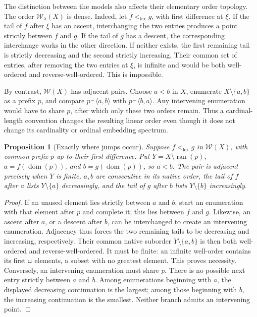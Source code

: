 \documentclass[11pt]{article}
\newtheorem{proposition}[proposition]{Proposition}
\theoremstyle{definition}
\theoremstyle{remark}
\newcommand{\WO}{\mathcal W}
\newcommand{\lex}{\mathrm{lex}}
\newcommand{\ran}{\operatorname{ran}}
\newcommand{\dom}{\operatorname{dom}}
\newcommand{\cat}{\mathbin{{}^\frown}}
\begin{document}
The distinction between the models also affects their elementary
order topology.  The order \(\WO_\lambda(X)\) is dense.
Indeed, let \(f<_{\lex}g\), with first difference at \(\xi\).
If the tail of \(f\) after \(\xi\) has an ascent, interchanging
the two entries produces a point strictly between \(f\) and \(g\).
If the tail of \(g\) has a descent, the corresponding interchange
works in the other direction.  If neither exists, the first
remaining tail is strictly decreasing and the second strictly
increasing.  Their common set of entries, after removing the two
entries at \(\xi\), is infinite and would be both well-ordered
and reverse-well-ordered.  This is impossible.

By contrast, \(\WO(X)\) has adjacent pairs.  Choose \(a<b\) in \(X\),
enumerate \(X\setminus\{a,b\}\) as a prefix \(p\), and compare
\(p\cat\langle a,b\rangle\) with
\(p\cat\langle b,a\rangle\).  Any intervening enumeration would have
to share \(p\), after which only these two orders remain.
Thus a cardinal-length convention changes the resulting linear
order even though it does not change its cardinality or ordinal
embedding spectrum.

\begin{proposition}[Exactly where jumps occur]\label{swo:sw:adjacency}
Suppose \(f<_{\lex}g\) in \(\WO(X)\), with common prefix \(p\)
up to their first difference.  Put
\(Y=X\setminus\ran(p)\), \(a=f(\dom(p))\), and
\(b=g(\dom(p))\), so \(a<b\).
The pair is adjacent precisely when \(Y\) is finite,
\(a,b\) are consecutive in its native order, the tail of
\(f\) after \(a\) lists \(Y\setminus\{a\}\) decreasingly,
and the tail of \(g\) after \(b\) lists
\(Y\setminus\{b\}\) increasingly.
\end{proposition}

\begin{proof}
If an unused element lies strictly between \(a\) and \(b\),
start an enumeration with that element after \(p\) and
complete it; this lies between \(f\) and \(g\).
Likewise, an ascent after \(a\), or a descent after \(b\),
can be interchanged to create an intervening enumeration.
Adjacency thus forces the two remaining tails to be
decreasing and increasing, respectively.
Their common native suborder \(Y\setminus\{a,b\}\) is then
both well-ordered and reverse-well-ordered.
It must be finite: an infinite well-order contains its
first \(\omega\) elements, a subset with no greatest element.
This proves necessity.
Conversely, an intervening enumeration must share \(p\).
There is no possible next entry strictly between \(a\)
and \(b\).  Among enumerations beginning with \(a\), the
displayed decreasing continuation is the largest; among
those beginning with \(b\), the increasing continuation
is the smallest.  Neither branch admits an intervening point.
\end{proof}
\end{document}
